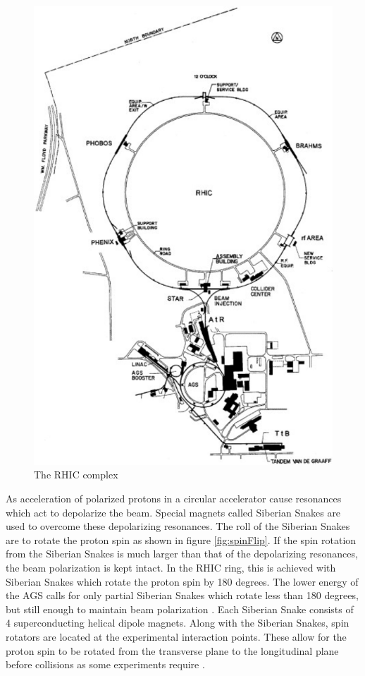 \documentclass[abstract = on,listof=totoc, bibliography=totoc]{scrreprt}
\begin{document}
 \begin{figure}
\begin{center}
\includegraphics[width = 1\textwidth]{rhicBNL}
\caption[The RHIC complex]{The RHIC complex}
\label{fig:rhic}
\end{center}
\end{figure}
As acceleration of polarized protons in a circular accelerator cause resonances which act to depolarize the beam. Special magnets called Siberian Snakes are used to overcome these depolarizing resonances. The roll of the Siberian Snakes are to rotate the proton spin as shown in figure \ref{fig:spinFlip}. If the spin rotation from the Siberian Snakes is much larger than that of the depolarizing resonances, the beam polarization is kept intact. In the RHIC ring, this is achieved with Siberian Snakes which rotate the proton spin by 180 degrees. The lower energy of the AGS calls for only partial Siberian Snakes which rotate less than 180 degrees, but still enough to maintain beam polarization \cite{ppCollider}.
Each Siberian Snake consists of 4 superconducting helical dipole magnets. Along with the Siberian Snakes, spin rotators are located at the experimental interaction points. These allow for the proton spin to be rotated from the transverse plane to the longitudinal plane before collisions as some experiments require \cite{ppCollider}.
\end{document}
